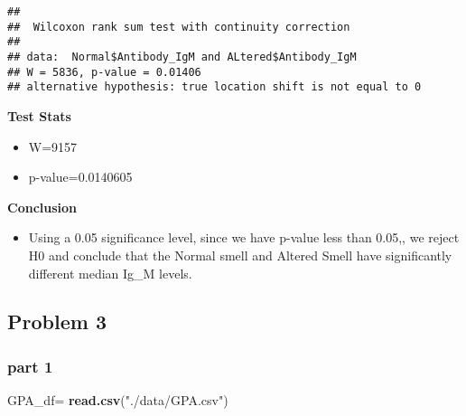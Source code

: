 \documentclass[]{article}
\newenvironment{Shaded}{\begin{snugshade}}{\end{snugshade}}
\newcommand{\DataTypeTok}[1]{\textcolor[rgb]{0.13,0.29,0.53}{#1}}
\newcommand{\DecValTok}[1]{\textcolor[rgb]{0.00,0.00,0.81}{#1}}
\newcommand{\KeywordTok}[1]{\textcolor[rgb]{0.13,0.29,0.53}{\textbf{#1}}}
\newcommand{\NormalTok}[1]{#1}
\newcommand{\OperatorTok}[1]{\textcolor[rgb]{0.81,0.36,0.00}{\textbf{#1}}}
\newcommand{\OtherTok}[1]{\textcolor[rgb]{0.56,0.35,0.01}{#1}}
\newcommand{\StringTok}[1]{\textcolor[rgb]{0.31,0.60,0.02}{#1}}
\providecommand{\tightlist}{%
  \setlength{\itemsep}{0pt}\setlength{\parskip}{0pt}}
\begin{document}
\begin{verbatim}
## 
##  Wilcoxon rank sum test with continuity correction
## 
## data:  Normal$Antibody_IgM and ALtered$Antibody_IgM
## W = 5836, p-value = 0.01406
## alternative hypothesis: true location shift is not equal to 0
\end{verbatim}

\begin{Shaded}
\end{Shaded}

\textbf{Test Stats}

\begin{itemize}
\tightlist
\item
  W=9157
\item
  p-value=0.0140605
\end{itemize}

\textbf{Conclusion}

\begin{itemize}
\tightlist
\item
  Using a 0.05 significance level, since we have p-value less than
  0.05,, we reject H0 and conclude that the Normal smell and Altered
  Smell have significantly different median Ig\_M levels.
\end{itemize}

\hypertarget{problem-3}{%
\subsection{Problem 3}\label{problem-3}}

\hypertarget{part-1}{%
\subsubsection{part 1}\label{part-1}}

\begin{Shaded}
\begin{Highlighting}[]
\NormalTok{GPA_df=}
\StringTok{   }\KeywordTok{read.csv}\NormalTok{(}\StringTok{"./data/GPA.csv"}\NormalTok{)}
\end{Highlighting}
\end{Shaded}

\begin{Shaded}
\end{Shaded}
\end{document}
